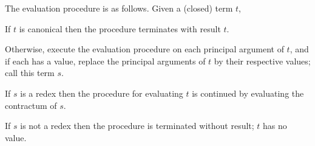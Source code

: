\label{EvalProc}
The evaluation procedure is as follows.
Given a (closed) term $t$, 
\begin{description}{}
\item	If $t$ is canonical then the procedure terminates with result $t$.
\item	Otherwise, execute the evaluation procedure on each
	principal argument of $t$, and if each has a value,
	replace the principal arguments of $t$ by their respective
	values; call this term $s$.
\item	If $s$ is a redex then the procedure for evaluating $t$ is continued
	by evaluating the contractum of $s$.
\item	If $s$ is not a redex then the procedure is terminated
	without result; $t$ has no value.
\end{description}

